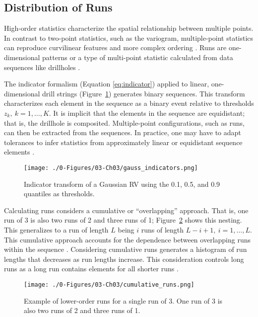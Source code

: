 \FloatBarrier
\subsection{Distribution of Runs}
\label{subsec:03runs}

High-order statistics characterize the spatial relationship between multiple points. In contrast to two-point statistics, such as the variogram, multiple-point statistics can reproduce curvilinear features and more complex ordering \citep{guardiano1993multivariate}. Runs are one-dimensional patterns or a type of multi-point statistic calculated from data sequences like drillholes \citep{boisvert2007multiplepoint}.

The indicator formalism (Equation \ref{eq:indicator}) applied to linear, one-dimensional drill strings (Figure~\ref{fig:gauss_indicators}) generates binary sequences. This transform characterizes each element in the sequence as a binary event relative to thresholds $z_{k}, \ k=1,\dots,K$. It is implicit that the elements in the sequence are equidistant; that is, the drillhole is composited. Multiple-point configurations, such as runs, can then be extracted from the sequences. In practice, one may have to adapt tolerances to infer statistics from approximately linear or equidistant sequence elements \citep{ortiz2003characterization}.

\begin{figure}[htb!]
    \centering
    \texttt{[image: ./0-Figures/03-Ch03/gauss\_indicators.png]}
    \caption{Indicator transform of a Gaussian \gls{RV} using the 0.1, 0.5, and 0.9 quantiles as thresholds. }
    \label{fig:gauss_indicators}
\end{figure}

Calculating runs considers a cumulative or ``overlapping'' approach. That is, one run of 3 is also two runs of 2 and three runs of 1; Figure~\ref{fig:cumulative_runs} shows this nesting. This generalizes to a run of length $L$ being $i$ runs of length $L-i+1, \ i=1,\dots,L$. This cumulative approach accounts for the dependence between overlapping runs within the sequence \citep{fu2003distribution}. Considering cumulative runs generates a histogram of run lengths that decreases as run lengths increase. This consideration controls long runs as a long run contains elements for all shorter runs \citep{ortiz2003characterization}.

\begin{figure}[htb!]
    \centering
    \texttt{[image: ./0-Figures/03-Ch03/cumulative\_runs.png]}
    \caption{Example of lower-order runs for a single run of 3. One run of 3 is also two runs of 2 and three runs of 1.}
    \label{fig:cumulative_runs}
\end{figure}

